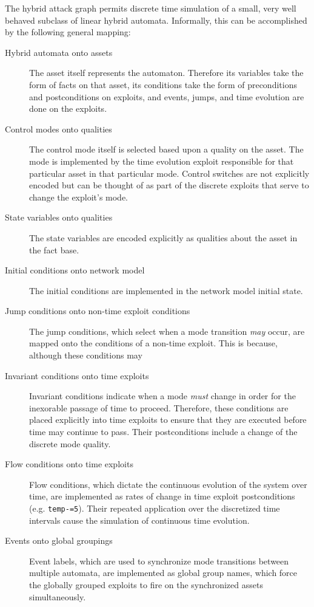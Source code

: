The hybrid attack graph permits discrete time
simulation of a small, very well behaved subclass of linear hybrid automata. 
Informally, this can be accomplished by the following general mapping:
\begin{description}
\item[Hybrid automata onto assets] The asset itself represents the automaton.
    Therefore its variables take the form of facts on that asset, its
    conditions take the form of preconditions and postconditions on exploits,
    and events, jumps, and time evolution are done on the exploits.
\item[Control modes onto qualities] The control mode itself is selected based
    upon a quality on the asset. The mode is implemented by the time
    evolution exploit responsible for that particular asset in that
    particular mode. Control switches are not explicitly encoded but can be
    thought of as part of the discrete exploits that serve to change the
    exploit's mode.
\item[State variables onto qualities] The state variables are encoded
    explicitly as qualities about the asset in the fact base.
\item[Initial conditions onto network model] The initial conditions are
    implemented in the network model initial state.
\item[Jump conditions onto non-time exploit conditions] The jump conditions,
    which select when a mode transition \emph{may} occur, are mapped onto
    the conditions of a non-time exploit. This is because, although these
    conditions may 
\item[Invariant conditions onto time exploits] Invariant conditions indicate
    when a mode \emph{must} change in order for the inexorable passage of time
    to proceed. Therefore, these conditions are placed explicitly into time 
    exploits to ensure that they are executed before time may continue to pass.
    Their postconditions include a change of the discrete mode quality.
\item[Flow conditions onto time exploits] Flow conditions, which dictate the
    continuous evolution of the system over time, are implemented as rates of
    change in time exploit postconditions (e.g. \texttt{temp-=5}). Their
    repeated application over the discretized time intervals cause the
    simulation of continuous time evolution.
\item[Events onto global groupings] Event labels, which are used to synchronize
    mode transitions between multiple automata, are implemented as global group
    names, which force the globally grouped exploits to fire on the
    synchronized assets simultaneously.
\end{description}

